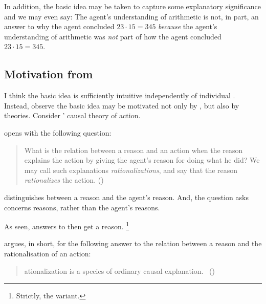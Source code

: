 \begin{note}
  In addition, the basic idea may be taken to capture some explanatory significance and we may even say:
  The agent's understanding of arithmetic is not, in part, an answer to why the agent concluded \(23 \cdot 15 = 345\) \emph{because} the agent's understanding of arithmetic was \emph{not} part of how the agent concluded \(23 \cdot 15 = 345\).
\end{note}

\subsection{Motivation from \citeauthor{Davidson:1963aa}}

\begin{note}
  I think the basic idea is sufficiently intuitive independently of individual .
  Instead, observe the basic idea may be motivated not only by , but also by theories.
  Consider \citeauthor{Davidson:1963aa}' causal theory of action.

  \citeauthor{Davidson:1963aa} opens  with the following question:

  \begin{quote}
    What is the relation between a reason and an action when the reason explains the action by giving the agent's reason for doing what he did?
    We may call such explanations \emph{rationalizations}, and say that the reason \emph{rationalizes} the action.%
    \mbox{}\hfill\mbox{(\citeyear[685]{Davidson:1963aa})}
  \end{quote}

  \citeauthor{Davidson:1963aa} distinguishes between a reason and the agent's reason.
  And, the question \citeauthor{Davidson:1963aa} asks concerns reasons, rather than the agent's reasons.

  As seen, answers to \qWhy{} then get a reason.%
  \footnote{
    Strictly, the variant.
  }

  \citeauthor{Davidson:1963aa} argues, in short, for the following answer to the relation between a reason and the rationalisation of an action:

  \begin{quote}
    \begin{enumerate}[label=\arabic*]
      [R]ationalization is a species of ordinary causal explanation.\newline
      \mbox{ }\hfill\mbox{(\citeyear[685]{Davidson:1963aa})}
    \end{enumerate}
  \end{quote}


\end{note}
